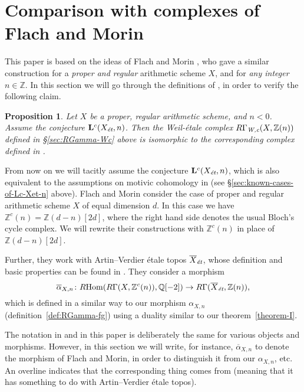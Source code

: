 \documentclass[leqno,12pt]{article}
\theoremstyle{plain}
\newtheorem{proposition}[theorem]{\indent\sc Proposition}
\theoremstyle{definition}
\DeclareMathOperator{\Hom}{Hom}
\newcommand{\ZZ}{\mathbb{Z}}
\newcommand{\QQ}{\mathbb{Q}}
\newcommand{\Wc}{\text{\it W,c}}
\newcommand{\et}{\text{\it \'{e}t}}
\newcommand{\RHom}{R\!\Hom}
\begin{document}

\section{Comparison with complexes of Flach and Morin}
\label{sec:comparison-with-FM}

This paper is based on the ideas of Flach and Morin \cite{Flach-Morin-2018}, who
gave a similar construction for a \emph{proper and regular} arithmetic scheme
$X$, and for \emph{any integer} $n \in \ZZ$. In this section we will go through
the definitions of \cite{Flach-Morin-2018}, in order to verify the following
claim.

\begin{proposition}
  \label{prop:comparison-with-FM}
  Let $X$ be a proper, regular arithmetic scheme, and $n < 0$. Assume the
  conjecture $\mathbf{L}^c (X_\et, n)$. Then the Weil-\'{e}tale complex
  $R\Gamma_\Wc (X, \ZZ(n))$ defined in {\rm \S\ref{sec:RGamma-Wc}} above is isomorphic
  to the corresponding complex defined in {\rm \cite{Flach-Morin-2018}}.
\end{proposition}

From now on we will tacitly assume the conjecture $\mathbf{L}^c (X_\et, n)$,
which is also equivalent to the assumptions on motivic cohomology in
\cite{Flach-Morin-2018} (see \S\ref{sec:known-cases-of-Lc-Xet-n} above). Flach
and Morin consider the case of proper and regular arithmetic scheme $X$ of equal
dimension $d$. In this case we have $\ZZ^c (n) = \ZZ (d-n) [2d]$, where the
right hand side denotes the usual Bloch's cycle complex. We will rewrite their
constructions with $\ZZ^c (n)$ in place of $\ZZ (d-n) [2d]$.

Further, they work with Artin--Verdier \'{e}tale topos $\overline{X}_\et$, whose
definition and basic properties can be found in \cite[\S 6]{Flach-Morin-2018}.
They consider a morphism
\[ \overline{\alpha}_{X,n}\colon \RHom (R\Gamma (X, \ZZ^c (n)), \QQ [-2]) \to
  R\Gamma (\overline{X}_\et, \ZZ (n)), \]
which is defined in a similar way to our morphism $\alpha_{X,n}$
(definition~\ref{def:RGamma-fg}) using a duality similar to our
theorem~\ref{theorem-I}.

The notation in \cite{Flach-Morin-2018} and in this paper is deliberately the
same for various objects and morphisms. However, in this section we will write,
for instance, $\overline{\alpha}_{X,n}$ to denote the morphism of Flach and
Morin, in order to distinguish it from our $\alpha_{X,n}$, etc. An overline
indicates that the corresponding thing comes from \cite{Flach-Morin-2018}
(meaning that it has something to do with Artin--Verdier \'{e}tale topos).
\end{document}
